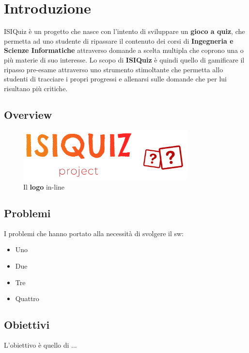 

\chapter{Introduzione}
ISIQuiz è un progetto che nasce con l'intento di sviluppare un \textbf{gioco a quiz}, che permetta ad uno studente di ripassare il contenuto dei corsi di \textbf{Ingegneria e Scienze Informatiche} attraverso domande a scelta multipla che coprono una o più materie di suo interesse. Lo scopo di \textbf{ISIQuiz} è quindi quello di gamificare il ripasso pre-esame attraverso uno strumento stimoltante che permetta allo studenti di tracciare i propri progressi e allenarsi sulle domande che per lui risultano più critiche.

\section{Overview}

\begin{figure}[H]
    \caption{Il \textbf{logo} in-line}
    \label{fig:Logo}
    \centering
    \includegraphics[width=0.8\textwidth]{Extra/ISIQuizLogoLineTransparent.png}
\end{figure}

\section{Problemi}
I problemi che hanno portato alla necessità di svolgere il sw:
\begin{itemize}
    \item Uno
    \item Due
    \item Tre
    \item Quattro
\end{itemize}
 




\section{Obiettivi}
L'obiettivo è quello di ... 




